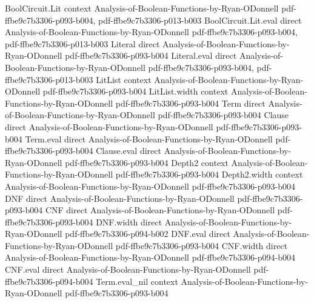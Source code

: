 \begin{lemma}
\label{BooleanAnalysis.chiS_empty}
\leanok
{}
\proofstep
  {BoolCircuit.Lit}
  {context}
  {Analysis-of-Boolean-Functions-by-Ryan-ODonnell}
  {pdf-ffbe9c7b3306-p093-b004,
    pdf-ffbe9c7b3306-p013-b003}
\proofstep
  {BoolCircuit.Lit.eval}
  {direct}
  {Analysis-of-Boolean-Functions-by-Ryan-ODonnell}
  {pdf-ffbe9c7b3306-p093-b004,
    pdf-ffbe9c7b3306-p013-b003}
\proofstep
  {Literal}
  {direct}
  {Analysis-of-Boolean-Functions-by-Ryan-ODonnell}
  {pdf-ffbe9c7b3306-p093-b004}
\proofstep
  {Literal.eval}
  {direct}
  {Analysis-of-Boolean-Functions-by-Ryan-ODonnell}
  {pdf-ffbe9c7b3306-p093-b004,
    pdf-ffbe9c7b3306-p013-b003}
\proofstep
  {LitList}
  {context}
  {Analysis-of-Boolean-Functions-by-Ryan-ODonnell}
  {pdf-ffbe9c7b3306-p093-b004}
\proofstep
  {LitList.width}
  {context}
  {Analysis-of-Boolean-Functions-by-Ryan-ODonnell}
  {pdf-ffbe9c7b3306-p093-b004}
\proofstep
  {Term}
  {direct}
  {Analysis-of-Boolean-Functions-by-Ryan-ODonnell}
  {pdf-ffbe9c7b3306-p093-b004}
\proofstep
  {Clause}
  {direct}
  {Analysis-of-Boolean-Functions-by-Ryan-ODonnell}
  {pdf-ffbe9c7b3306-p093-b004}
\proofstep
  {Term.eval}
  {direct}
  {Analysis-of-Boolean-Functions-by-Ryan-ODonnell}
  {pdf-ffbe9c7b3306-p093-b004}
\proofstep
  {Clause.eval}
  {direct}
  {Analysis-of-Boolean-Functions-by-Ryan-ODonnell}
  {pdf-ffbe9c7b3306-p093-b004}
\proofstep
  {Depth2}
  {context}
  {Analysis-of-Boolean-Functions-by-Ryan-ODonnell}
  {pdf-ffbe9c7b3306-p093-b004}
\proofstep
  {Depth2.width}
  {context}
  {Analysis-of-Boolean-Functions-by-Ryan-ODonnell}
  {pdf-ffbe9c7b3306-p093-b004}
\proofstep
  {DNF}
  {direct}
  {Analysis-of-Boolean-Functions-by-Ryan-ODonnell}
  {pdf-ffbe9c7b3306-p093-b004}
\proofstep
  {CNF}
  {direct}
  {Analysis-of-Boolean-Functions-by-Ryan-ODonnell}
  {pdf-ffbe9c7b3306-p093-b004}
\proofstep
  {DNF.width}
  {direct}
  {Analysis-of-Boolean-Functions-by-Ryan-ODonnell}
  {pdf-ffbe9c7b3306-p094-b002}
\proofstep
  {DNF.eval}
  {direct}
  {Analysis-of-Boolean-Functions-by-Ryan-ODonnell}
  {pdf-ffbe9c7b3306-p093-b004}
\proofstep
  {CNF.width}
  {direct}
  {Analysis-of-Boolean-Functions-by-Ryan-ODonnell}
  {pdf-ffbe9c7b3306-p094-b004}
\proofstep
  {CNF.eval}
  {direct}
  {Analysis-of-Boolean-Functions-by-Ryan-ODonnell}
  {pdf-ffbe9c7b3306-p094-b004}
\proofstep
  {Term.eval_nil}
  {context}
  {Analysis-of-Boolean-Functions-by-Ryan-ODonnell}
  {pdf-ffbe9c7b3306-p093-b004}

\end{lemma}
